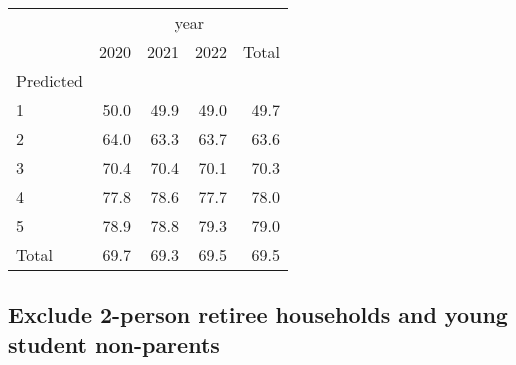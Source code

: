 \documentclass{article}
\begin{document}
\begin{minipage}[b]{.40\textwidth}
\begin{tabular}{lllll}
	\cline{1-5}
	\multicolumn{1}{c}{} &
	\multicolumn{4}{|c}{year} \\
	\multicolumn{1}{c}{} &
	\multicolumn{1}{|r}{2020} &
	\multicolumn{1}{r}{2021} &
	\multicolumn{1}{r}{2022} &
	\multicolumn{1}{r}{Total} \\
	\cline{1-5}
	\multicolumn{1}{l}{Predicted} &
	\multicolumn{1}{|r}{} &
	\multicolumn{1}{r}{} &
	\multicolumn{1}{r}{} &
	\multicolumn{1}{r}{} \\
	\multicolumn{1}{l}{\hspace{1em}1} &
	\multicolumn{1}{|r}{50.0} &
	\multicolumn{1}{r}{49.9} &
	\multicolumn{1}{r}{49.0} &
	\multicolumn{1}{r}{49.7} \\
	\multicolumn{1}{l}{\hspace{1em}2} &
	\multicolumn{1}{|r}{64.0} &
	\multicolumn{1}{r}{63.3} &
	\multicolumn{1}{r}{63.7} &
	\multicolumn{1}{r}{63.6} \\
	\multicolumn{1}{l}{\hspace{1em}3} &
	\multicolumn{1}{|r}{70.4} &
	\multicolumn{1}{r}{70.4} &
	\multicolumn{1}{r}{70.1} &
	\multicolumn{1}{r}{70.3} \\
	\multicolumn{1}{l}{\hspace{1em}4} &
	\multicolumn{1}{|r}{77.8} &
	\multicolumn{1}{r}{78.6} &
	\multicolumn{1}{r}{77.7} &
	\multicolumn{1}{r}{78.0} \\
	\multicolumn{1}{l}{\hspace{1em}5} &
	\multicolumn{1}{|r}{78.9} &
	\multicolumn{1}{r}{78.8} &
	\multicolumn{1}{r}{79.3} &
	\multicolumn{1}{r}{79.0} \\
	\multicolumn{1}{l}{\hspace{1em}Total} &
	\multicolumn{1}{|r}{69.7} &
	\multicolumn{1}{r}{69.3} &
	\multicolumn{1}{r}{69.5} &
	\multicolumn{1}{r}{69.5} \\
	\cline{1-5}
\end{tabular}
\end{minipage}

\subsection{Exclude 2-person retiree households and young student non-parents}
\end{document}
